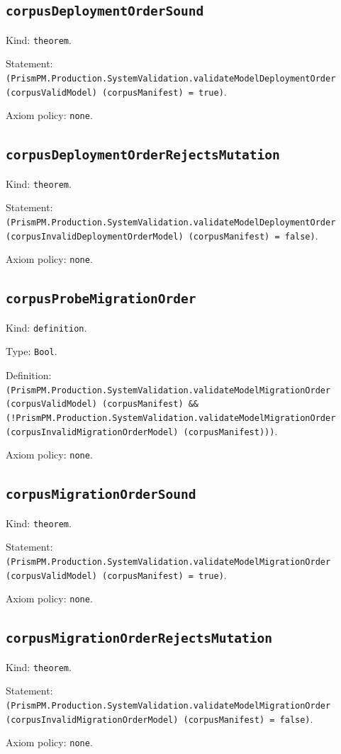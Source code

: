 \documentclass[11pt]{article}
\begin{document}
\subsection*{\texttt{corpusDeploymentOrderSound}}
\noindent Kind: \texttt{theorem}.\par
\noindent Statement: \texttt{(PrismPM.Production.SystemValidation.validateModelDeploymentOrder (corpusValidModel) (corpusManifest) = true)}.\par
\noindent Axiom policy: \texttt{none}.\par
\subsection*{\texttt{corpusDeploymentOrderRejectsMutation}}
\noindent Kind: \texttt{theorem}.\par
\noindent Statement: \texttt{(PrismPM.Production.SystemValidation.validateModelDeploymentOrder (corpusInvalidDeploymentOrderModel) (corpusManifest) = false)}.\par
\noindent Axiom policy: \texttt{none}.\par
\subsection*{\texttt{corpusProbeMigrationOrder}}
\noindent Kind: \texttt{definition}.\par
\noindent Type: \texttt{Bool}.\par
\noindent Definition: \texttt{(PrismPM.Production.SystemValidation.validateModelMigrationOrder (corpusValidModel) (corpusManifest) \&\& (!PrismPM.Production.SystemValidation.validateModelMigrationOrder (corpusInvalidMigrationOrderModel) (corpusManifest)))}.\par
\noindent Axiom policy: \texttt{none}.\par
\subsection*{\texttt{corpusMigrationOrderSound}}
\noindent Kind: \texttt{theorem}.\par
\noindent Statement: \texttt{(PrismPM.Production.SystemValidation.validateModelMigrationOrder (corpusValidModel) (corpusManifest) = true)}.\par
\noindent Axiom policy: \texttt{none}.\par
\subsection*{\texttt{corpusMigrationOrderRejectsMutation}}
\noindent Kind: \texttt{theorem}.\par
\noindent Statement: \texttt{(PrismPM.Production.SystemValidation.validateModelMigrationOrder (corpusInvalidMigrationOrderModel) (corpusManifest) = false)}.\par
\noindent Axiom policy: \texttt{none}.\par
\end{document}
